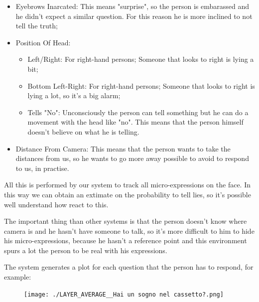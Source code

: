 \documentclass[12pt]{article}
\begin{document}
\begin{itemize}
\begin{itemize}
    \end{itemize}
    
    \item Eyebrows Inarcated: This means "surprise", so the person is embarassed and he didn't expect a similar question. For this reason he is more inclined to not tell the truth;
    
    
    
    \item Position Of Head:
    
    \begin{itemize}
    
        \item Left/Right: For right-hand persons; Someone that looks to right is lying a bit;
        
        \item Bottom Left-Right: For right-hand persons; Someone that looks to right is lying a lot, so it's a big alarm;
        
        \item Tells "No": Unconsciously the person can tell something but he can do a movement with the head like "no". This means that the person himself doesn't believe on what he is telling.
        
    \end{itemize}
    
    \item Distance From Camera: This means that the person wants to take the distances from us, so he wants to go more away possible to avoid to respond to us, in practise.

\end{itemize}

All this is performed by our system to track all micro-expressions on the face. In this way we can obtain an extimate on the probability to tell lies, so it's possible well understand how react to this. 

The important thing than other systems is that the person doesn't know where camera is and he hasn't have someone to talk, so it's more difficult to him to hide his micro-expressions, because he hasn't a reference point and this environment spurs a lot the person to be real with his expressions.

The system generates a plot for each question that the person has to respond, for example:

\begin{figure}[H]

    \texttt{[image: ./LAYER\_AVERAGE\_\_Hai un sogno nel cassetto?.png]}

\end{figure}
\end{document}
